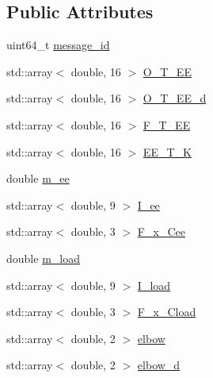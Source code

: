 \subsection*{Public Attributes}
\begin{DoxyCompactItemize}
\item 
uint64\+\_\+t \hyperlink{structresearch__interface_1_1robot_1_1RobotState_a803676123685390b8c4d5a3907d16e7c}{message\+\_\+id}
\item 
std\+::array$<$ double, 16 $>$ \hyperlink{structresearch__interface_1_1robot_1_1RobotState_ae08012fa47c14854e7df2e23e06f9cc8}{O\+\_\+\+T\+\_\+\+EE}
\item 
std\+::array$<$ double, 16 $>$ \hyperlink{structresearch__interface_1_1robot_1_1RobotState_adc9d94f4d9d01026a45f496851578549}{O\+\_\+\+T\+\_\+\+E\+E\+\_\+d}
\item 
std\+::array$<$ double, 16 $>$ \hyperlink{structresearch__interface_1_1robot_1_1RobotState_a8b2bfb818136741f4430b7bf24c6371d}{F\+\_\+\+T\+\_\+\+EE}
\item 
std\+::array$<$ double, 16 $>$ \hyperlink{structresearch__interface_1_1robot_1_1RobotState_ab3ae394f44f83d8b662116fe2646f878}{E\+E\+\_\+\+T\+\_\+K}
\item 
double \hyperlink{structresearch__interface_1_1robot_1_1RobotState_ad2a90c42e0bfe6afd63c9c6cb9ffe296}{m\+\_\+ee}
\item 
std\+::array$<$ double, 9 $>$ \hyperlink{structresearch__interface_1_1robot_1_1RobotState_a0084f1511609a0e1fb8129322fbc3615}{I\+\_\+ee}
\item 
std\+::array$<$ double, 3 $>$ \hyperlink{structresearch__interface_1_1robot_1_1RobotState_a3a90284a35ace0f9195d908bd1be9bff}{F\+\_\+x\+\_\+\+Cee}
\item 
double \hyperlink{structresearch__interface_1_1robot_1_1RobotState_a8c9a58bb09391b1fd11a1b016540b46c}{m\+\_\+load}
\item 
std\+::array$<$ double, 9 $>$ \hyperlink{structresearch__interface_1_1robot_1_1RobotState_a3659f248d980cc8e41a47ccb925a990b}{I\+\_\+load}
\item 
std\+::array$<$ double, 3 $>$ \hyperlink{structresearch__interface_1_1robot_1_1RobotState_a25b4761b1d35bb62d1bb216a6645dc3b}{F\+\_\+x\+\_\+\+Cload}
\item 
std\+::array$<$ double, 2 $>$ \hyperlink{structresearch__interface_1_1robot_1_1RobotState_a4ac18ad24b6fb5920ebcad68738fbf7e}{elbow}
\item 
std\+::array$<$ double, 2 $>$ \hyperlink{structresearch__interface_1_1robot_1_1RobotState_a9c530a7b49835c5c44c4e9b820c7329c}{elbow\+\_\+d}

\end{DoxyCompactItemize}

